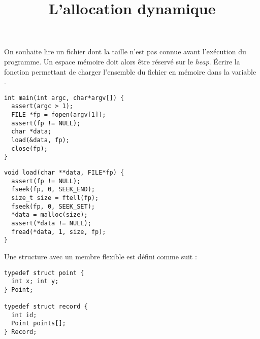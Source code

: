 \documentclass[french,a4paper,addpoints,11pt]{exam}
\title{L'allocation dynamique}
\begin{document}
\maketitle
\thispagestyle{headandfoot}

\ifprintanswers
\else
\begin{multicols}{2}
\fi
\begin{questions}

\question
On souhaite lire un fichier dont la taille n'est pas connue avant l'exécution du programme. Un espace mémoire doit alors être réservé sur le \emph{heap}. Écrire la fonction  permettant de charger l'ensemble du fichier en mémoire dans la variable .

\begin{lstlisting}
int main(int argc, char*argv[]) {
  assert(argc > 1);
  FILE *fp = fopen(argv[1]);
  assert(fp != NULL);
  char *data;
  load(&data, fp);
  close(fp);
}
\end{lstlisting}

\begin{solution}
\begin{lstlisting}
void load(char **data, FILE*fp) {
  assert(fp != NULL);
  fseek(fp, 0, SEEK_END);
  size_t size = ftell(fp);
  fseek(fp, 0, SEEK_SET);
  *data = malloc(size);
  assert(*data != NULL);
  fread(*data, 1, size, fp);
}
\end{lstlisting}
\end{solution}

\question
Une structure avec un membre flexible est défini comme suit :

\begin{lstlisting}
typedef struct point {
  int x; int y;
} Point;

typedef struct record {
  int id;
  Point points[];
} Record;
\end{lstlisting}

\end{questions}
\end{multicols}
\end{document}
